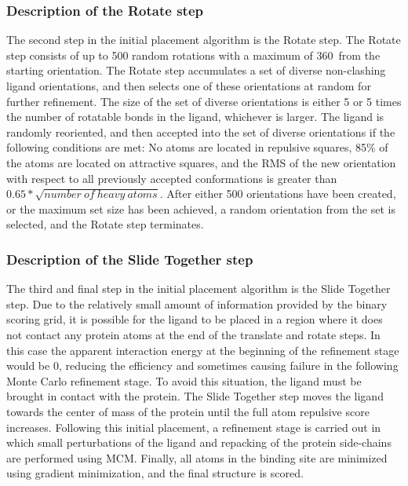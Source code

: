 \subsubsection{Description of the Rotate step}
The second step in the initial placement algorithm is the Rotate step.
The Rotate step consists of up to 500 random rotations with a maximum of 360\textdegree\ from the starting orientation.
The Rotate step accumulates a set of diverse non-clashing ligand orientations, and then selects one of these orientations at random for further refinement.
The size of the set of diverse orientations is either 5 or 5 times the number of rotatable bonds in the ligand, whichever is larger.
The ligand is randomly reoriented, and then accepted into the set of diverse orientations if the following conditions are met: No atoms are located in repulsive squares, 85\% of the atoms are located on attractive squares, and the RMS of the new orientation with respect to all previously accepted conformations is greater than $0.65*\sqrt{number\ of\ heavy\ atoms}$.
After either 500 orientations have been created, or the maximum set size has been achieved, a random orientation from the set is selected, and the Rotate step terminates.

\subsubsection{Description of the Slide Together step}
The third and final step in the initial placement algorithm is the Slide Together step.
Due to the relatively small amount of information provided by the binary scoring grid, it is possible for the ligand to be placed in a region where it does not contact any protein atoms at the end of the translate and rotate steps.
In this case the apparent interaction energy at the beginning of the refinement stage would be 0, reducing the efficiency and sometimes causing failure in the following Monte Carlo refinement stage.
To avoid this situation, the ligand must be brought in contact with the protein.
The Slide Together step moves the ligand towards the center of mass of the protein until the full atom repulsive score increases. 
Following this initial placement, a refinement stage is carried out in which small perturbations of the ligand and repacking of the protein side-chains are performed using MCM.
Finally, all atoms in the binding site are minimized using gradient minimization, and the final structure is scored.

